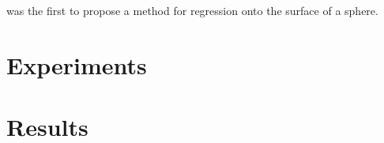 \documentclass[sigconf,10pt]{acmart}
\newcommand{\ignore}[1]{}
\begin{document}
\citet{fisher1992regression} was the first to propose a method for regression onto the surface of a sphere.

\section{Experiments}

\begin{figure}
\noindent
\caption{}
\end{figure}

\newpage


\section{Results}

\newpage
\appendix
\ignore{
\section{Languages and Day of Week}
\noindent

\noindent

\noindent

\noindent

\noindent

\noindent

\noindent

\noindent

\noindent

\noindent

\noindent

\noindent

\noindent

\noindent

\noindent

\noindent

\noindent

\noindent

\noindent

\noindent

\noindent
}
\end{document}
